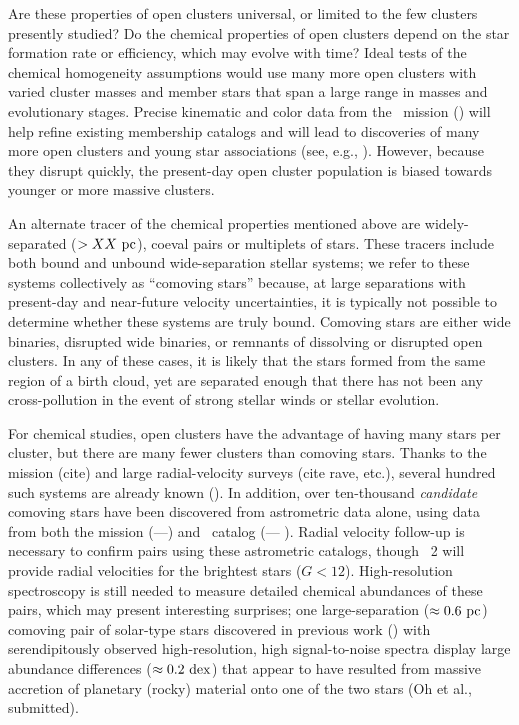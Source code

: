 \documentclass[modern, letterpaper]{aastex61}
\newcommand{\gaia}{\project{Gaia}}
\newcommand{\DR}[1]{\acronym{DR}#1}
\newcommand{\tgas}{\acronym{TGAS}}
\newcommand{\dex}{\ensuremath{{\rm dex}}}
\begin{document}
Are these properties of open clusters universal, or limited to the few clusters
presently studied?
Do the chemical properties of open clusters depend on the star formation rate or
efficiency, which may evolve with time?
Ideal tests of the chemical homogeneity assumptions would use many more open
clusters with varied cluster masses and member stars that span a large range in
masses and evolutionary stages.
Precise kinematic and color data from the \gaia\ mission
(\citealt{Gaia-Collaboration:2016,Gaia-Collaboration:2016a}) will help refine
existing membership catalogs and will lead to discoveries of many more open
clusters and young star associations (see, e.g., \citealt{Oh:2017}).
However, because they disrupt quickly, the present-day open cluster population
is biased towards younger or more massive clusters.

An alternate tracer of the chemical properties mentioned above are
widely-separated ($>XX~\mathrm{pc}$), coeval pairs or multiplets of stars.
These tracers include both bound and unbound wide-separation stellar systems; we
refer to these systems collectively as ``comoving stars'' because, at large
separations with present-day and near-future velocity uncertainties, it is
typically not possible to determine whether these systems are truly bound.
Comoving stars are either wide binaries, disrupted wide binaries, or remnants of
dissolving or disrupted open clusters.
In any of these cases, it is likely that the stars formed from the same region
of a birth cloud, yet are separated enough that there has not been any
cross-pollution in the event of strong stellar winds or stellar evolution.

For chemical studies, open clusters have the advantage of having many stars per
cluster, but there are many fewer clusters than comoving stars.
Thanks to the  mission (cite) and large radial-velocity
surveys (cite rave, etc.), several hundred such systems are already known
(\citealt{Shaya:2011}).
In addition, over ten-thousand \emph{candidate} comoving stars have been
discovered from astrometric data alone, using data from both the
 mission (\citealt{ESA:1997}---\citealt{Shaya:2011}) and
\tgas\ catalog (\citealt{Gaia-Collaboration:2016a}---
\citealt{Oh:2017,Andrews:2017}).
Radial velocity follow-up is necessary to confirm pairs using these astrometric
catalogs, though \gaia\ \DR{2} will provide radial velocities for the brightest
stars ($G < 12$).
High-resolution spectroscopy is still needed to measure detailed chemical
abundances of these pairs, which may present interesting surprises; one
large-separation ($\approx 0.6~\mathrm{pc}$) comoving pair of solar-type stars
discovered in previous work (\citealt{Oh:2017}) with serendipitously observed
high-resolution, high signal-to-noise spectra display large abundance
differences ($\approx 0.2~\dex$) that appear to have resulted from massive
accretion of planetary (rocky) material onto one of the two stars (Oh et al.,
submitted).
\end{document}
